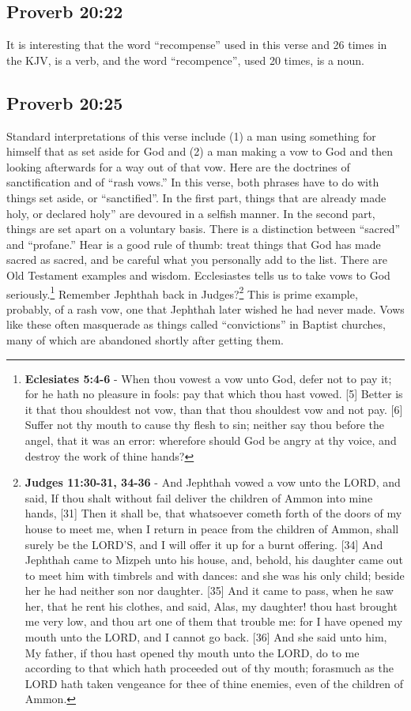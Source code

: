 \subsection{Proverb 20:22}
It is interesting that the word ``recompense'' used in this verse and 26 times in the KJV, is a verb, and the word ``recompence'', used 20 times, is a noun.

\subsection{Proverb 20:25}
Standard interpretations of this verse include (1) a man using something for himself that  as set aside for God and (2) a man making a vow to God and then looking afterwards for a way out of that vow. Here are the doctrines of sanctification and of ``rash vows.'' In this verse, both phrases have to do with things set aside, or ``sanctified''. In the first part, things that are already made holy, or declared holy'' are devoured in a selfish manner. In the second part, things are set apart on a voluntary basis. There is a distinction between ``sacred'' and ``profane.'' Hear is a good rule of thumb: treat things that God has made sacred as sacred, and be careful what you personally add to the list.
There are Old Testament examples and wisdom. Ecclesiastes tells us to take vows to God seriously.\footnote{\textbf{Eclesiates 5:4-6} - When thou vowest a vow unto God, defer not to pay it; for he hath no pleasure in fools: pay that which thou hast vowed. [5] Better is it that thou shouldest not vow, than that thou shouldest vow and not pay. [6] Suffer not thy mouth to cause thy flesh to sin; neither say thou before the angel, that it was an error: wherefore should God be angry at thy voice, and destroy the work of thine hands?} Remember Jephthah back in Judges?\footnote{\textbf{Judges 11:30-31, 34-36} - And Jephthah vowed a vow unto the LORD, and said, If thou shalt without fail deliver the children of Ammon into mine hands, [31] Then it shall be, that whatsoever cometh forth of the doors of my house to meet me, when I return in peace from the children of Ammon, shall surely be the LORD’S, and I will offer it up for a burnt offering. [34] And Jephthah came to Mizpeh unto his house, and, behold, his daughter came out to meet him with timbrels and with dances: and she was his only child; beside her he had neither son nor daughter. [35] And it came to pass, when he saw her, that he rent his clothes, and said, Alas, my daughter! thou hast brought me very low, and thou art one of them that trouble me: for I have opened my mouth unto the LORD, and I cannot go back. [36] And she said unto him, My father, if thou hast opened thy mouth unto the LORD, do to me according to that which hath proceeded out of thy mouth; forasmuch as the LORD hath taken vengeance for thee of thine enemies, even of the children of Ammon.} This is prime example, probably, of a rash vow, one that Jephthah later wished he had never made. Vows like these often masquerade as things called ``convictions'' in Baptist churches, many of which are abandoned shortly after getting them.


